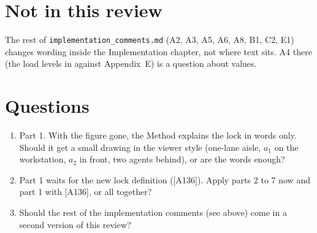 \documentclass[11pt,a4paper]{article}
\newcommand{\lab}[1]{\textsf{\footnotesize\detokenize{#1}}}
\begin{document}
\section*{Not in this review}
The rest of \texttt{implementation\_comments.md} (A2, A3, A5, A6, A8, B1, C2,
E1) changes wording inside the Implementation chapter, not where text sits.
A4 there (the load levels in \lab{tab:evalparams} against Appendix~E) is a
question about values.

\section*{Questions}
\begin{enumerate}[nosep]
  \item Part 1. With the figure gone, the Method explains the lock in words
    only. Should it get a small drawing in the viewer style (one-lane aisle,
    $a_1$ on the workstation, $a_2$ in front, two agents behind), or are the
    words enough?
  \item Part 1 waits for the new lock definition ([A136]). Apply parts 2 to 7
    now and part 1 with [A136], or all together?
  \item Should the rest of the implementation comments (see above) come in a
    second version of this review?
\end{enumerate}
\end{document}
